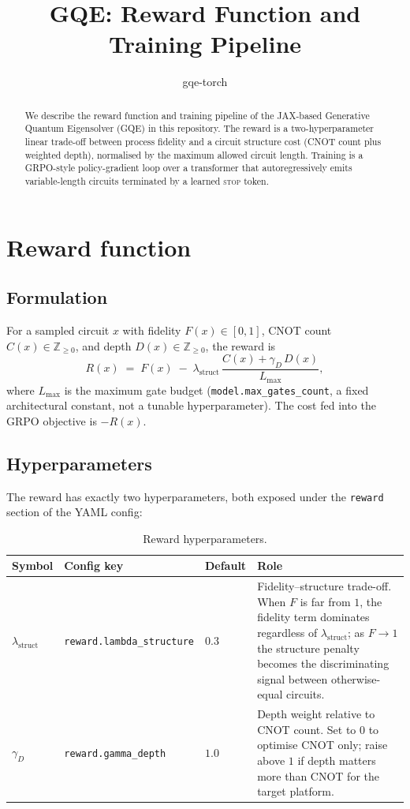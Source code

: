 \documentclass[11pt]{article}
\title{GQE: Reward Function and Training Pipeline}
\author{gqe-torch}
\date{}
\newcommand{\lammstruct}{\lambda_{\mathrm{struct}}}
\newcommand{\gammadepth}{\gamma_{D}}
\newcommand{\Lmax}{L_{\max}}
\begin{document}
\maketitle

\begin{abstract}
We describe the reward function and training pipeline of the JAX-based
Generative Quantum Eigensolver (GQE) in this repository. The reward is a
two-hyperparameter linear trade-off between process fidelity and a circuit
structure cost (CNOT count plus weighted depth), normalised by the maximum
allowed circuit length. Training is a GRPO-style policy-gradient loop over a
transformer that autoregressively emits variable-length circuits terminated by
a learned \textsc{stop} token.
\end{abstract}

\section{Reward function}

\subsection{Formulation}

For a sampled circuit $x$ with fidelity $F(x)\in[0,1]$, CNOT count $C(x)\in
\mathbb{Z}_{\ge 0}$, and depth $D(x)\in\mathbb{Z}_{\ge 0}$, the reward is
\begin{equation}
  R(x) \;=\; F(x) \;-\; \lammstruct\,\frac{C(x) + \gammadepth\, D(x)}{\Lmax},
  \label{eq:reward}
\end{equation}
where $\Lmax$ is the maximum gate budget (\texttt{model.max\_gates\_count},
a fixed architectural constant, not a tunable hyperparameter). The cost fed
into the GRPO objective is $-R(x)$.

\subsection{Hyperparameters}

The reward has exactly two hyperparameters, both exposed under the
\texttt{reward} section of the YAML config:

\begin{table}[h]
\centering
\begin{tabular}{lllp{7.3cm}}
\toprule
Symbol & Config key & Default & Role \\
\midrule
$\lammstruct$ & \texttt{reward.lambda\_structure} & $0.3$ &
Fidelity--structure trade-off. When $F$ is far from $1$, the fidelity term
dominates regardless of $\lammstruct$; as $F\to 1$ the structure penalty
becomes the discriminating signal between otherwise-equal circuits. \\
$\gammadepth$ & \texttt{reward.gamma\_depth} & $1.0$ &
Depth weight relative to CNOT count. Set to $0$ to optimise CNOT only;
raise above $1$ if depth matters more than CNOT for the target platform. \\
\bottomrule
\end{tabular}
\caption{Reward hyperparameters.}
\label{tab:reward-hp}
\end{table}
\end{document}
